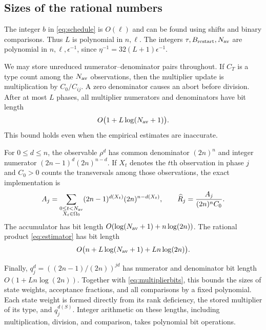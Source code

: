 \documentclass[11pt]{article}
\theoremstyle{definition}
\newcommand{\Om}{\Omega}
\begin{document}
\subsection{Sizes of the rational numbers}

The integer $b$ in \eqref{eq:schedule} is $O(\ell)$ and can be found
using shifts and binary comparisons.  Thus $L$ is polynomial in
$n,\ell$.  The integers $\tau,B_{\rm restart},N_{\rm av}$ are polynomial
in $n,\ell,\epsilon^{-1}$, since
$\eta^{-1}=32(L+1)\epsilon^{-1}$.

We may store unreduced numerator--denominator pairs throughout.  If
$C_T$ is a type count among the $N_{\rm av}$ observations, then the
multiplier update is multiplication by $C_0/C_{ij}$.  A zero denominator
causes an abort before division.  After at most $L$ phases, all
multiplier numerators and denominators have bit length
\begin{equation}\label{eq:multiplierbits}
 O\bigl(1+L\log(N_{\rm av}+1)\bigr).
\end{equation}
This bound holds even when the empirical estimates are inaccurate.

For $0\le d\le n$, the observable $\rho^d$ has common denominator
$(2n)^n$ and integer numerator $(2n-1)^d(2n)^{n-d}$.  If $X_t$ denotes
the $t$th observation in phase $j$ and $C_0>0$ counts the transversals
among those observations,
the exact implementation is
\begin{equation}\label{eq:integeraccumulator}
 A_j=\sum_{\substack{0\le t<N_{\rm av}\\X_t\in\Om_0}}
       (2n-1)^{d(X_t)}(2n)^{n-d(X_t)},
 \qquad \widehat R_j=\frac{A_j}{(2n)^nC_0}.
\end{equation}
The accumulator has bit length
$O(\log(N_{\rm av}+1)+n\log(2n))$.  The rational product
\eqref{eq:estimator} has bit length
\begin{equation}\label{eq:outputbits}
 O\bigl(n+L\log(N_{\rm av}+1)+Ln\log(2n)\bigr).
\end{equation}

Finally, $q_j^d=((2n-1)/(2n))^{jd}$ has numerator and denominator bit
length $O(1+Ln\log(2n))$.  Together with
\eqref{eq:multiplierbits}, this bounds the sizes of state weights,
acceptance fractions, and all comparisons by a fixed polynomial.
Each state weight is formed directly from its rank deficiency, the
stored multiplier of its type, and $q_j^{d(S)}$.
Integer arithmetic on these lengths, including multiplication,
division, and comparison, takes polynomial bit operations.
\end{document}
